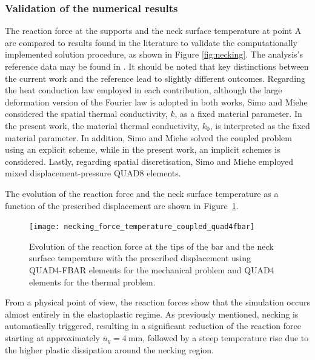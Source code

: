      \subsubsection{Validation of the numerical results}

     The reaction force at the supports and the neck surface temperature at point A are compared to results found in the literature to validate the computationally implemented solution procedure, as shown in Figure \ref{fig:necking}.
     The analysis's reference data may be found in \cite{simo_associative_1992}.
     It should be noted that key distinctions between the current work and the reference lead to slightly different outcomes.
     Regarding the heat conduction law employed in each contribution, although the large deformation version of the Fourier law is adopted in both works, Simo and Miehe \citep{simo_associative_1992} considered the spatial thermal conductivity, $k$, as a fixed material parameter.
     In the present work, the material thermal conductivity, $k_{0}$, is interpreted as the fixed material parameter.
     In addition, Simo and Miehe \citep{simo_associative_1992} solved the coupled problem using an explicit scheme, while in the present work, an implicit schemes is considered.
     Lastly, regarding  spatial discretisation, Simo and Miehe \citep{simo_associative_1992} employed mixed displacement-pressure QUAD8 elements.

     The evolution of the reaction force and the neck surface temperature as a function of the prescribed displacement are shown in Figure~\ref{fig:necking_force_temperature_coupled_quad4fbar}.
     \begin{figure}[!hbtp]
       \centering
       \texttt{[image: necking\_force\_temperature\_coupled\_quad4fbar]}
       \caption{Evolution of the reaction force at the tips of the bar and the neck surface temperature with the prescribed displacement using QUAD4-FBAR elements for the mechanical problem and QUAD4 elements for the thermal problem.}
       \label{fig:necking_force_temperature_coupled_quad4fbar}
     \end{figure}
     From a physical point of view, the reaction forces show that the simulation occurs almost entirely in the elastoplastic regime.
     As previously mentioned, necking is automatically triggered, resulting in a significant reduction of the reaction force starting at approximately $\bar{u}_{y}=\SI{4}{\milli\meter}$, followed by a steep temperature rise due to the higher plastic dissipation around the necking region.

